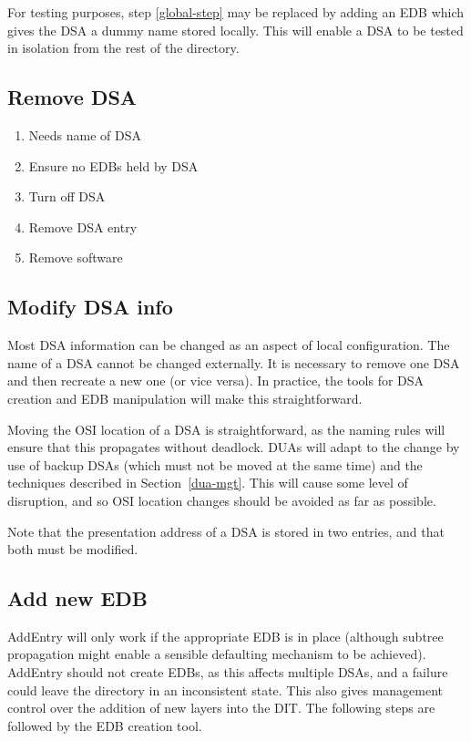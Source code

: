 For testing purposes, step \ref{global-step} may be replaced by adding an
EDB which gives the DSA a dummy name stored locally.  This will enable a DSA
to be tested in isolation from the rest of the directory.

\subsection {Remove DSA}

\begin {enumerate}
\item Needs name of DSA
\item Ensure no EDBs held by DSA
\item Turn off DSA
\item Remove DSA entry
\item Remove software
\end {enumerate}


\subsection {Modify DSA info}

Most DSA information can be changed as an aspect of local configuration.
The name of a DSA cannot be changed externally.  It is necessary to remove
one DSA and then recreate a new one (or vice versa).  In practice, the tools
for DSA creation and EDB manipulation will make this straightforward.  

Moving the OSI location of a DSA is straightforward, as the naming rules will
ensure that this propagates without deadlock.  DUAs will adapt to the change
by use of backup DSAs (which must not be moved at the same time) and the
techniques described in Section~\ref{dua-mgt}.
This will cause some level of disruption, and so OSI location changes should be
avoided as far as possible.

Note that the presentation address of a DSA is stored in two entries, and
that both must be modified.

\subsection {Add new EDB}

AddEntry will only work if the appropriate EDB is in place (although subtree
propagation might enable a sensible defaulting mechanism to be achieved).   
AddEntry should not create EDBs, as this affects multiple DSAs, and a failure
could leave the directory in an inconsistent state.  This also gives
management control over the addition of new layers into the DIT.
The following steps are followed by the EDB creation tool.

